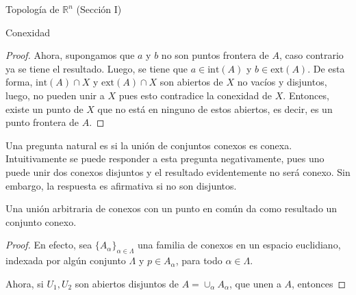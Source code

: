 \begin{chapter}{Topología de $\mathbb{R}^n$ (Sección I)}
\begin{section}{Conexidad}
\begin{proof}
Ahora, supongamos que $a$ y $b$ no son puntos frontera de $A$, caso contrario ya se tiene el resultado. Luego, se tiene que $a \in \text{int}(A)$ y $b \in \text{ext}(A)$. De esta forma, $\text{int}(A) \cap X$ y $\text{ext}(A) \cap X$ son abiertos de $X$ no vacíos y disjuntos, luego, no pueden unir a $X$ pues esto contradice la conexidad de $X$. Entonces, existe un punto de $X$ que no está en ninguno de estos abiertos, es decir, es un punto frontera de $A$.
\end{proof}

Una pregunta natural es si la unión de conjuntos conexos es conexa. Intuitivamente se puede responder a esta pregunta negativamente, pues uno puede unir dos conexos disjuntos y el resultado evidentemente no será conexo. Sin embargo, la respuesta es afirmativa si no son disjuntos.

\begin{them}

Una unión arbitraria de conexos con un punto en común da como resultado un conjunto conexo.

\end{them}

\begin{proof}

En efecto, sea $\{ A_{\alpha} \}_{\alpha \in \Lambda}$ una familia de conexos en un espacio euclidiano, indexada por algún conjunto $\Lambda$ y $p \in A_{\alpha}$, para todo $\alpha \in \Lambda$.

Ahora, si $U_1, U_2$ son abiertos disjuntos de $A = \cup_{\alpha} A_{\alpha}$, que unen a $A$, entonces

\end{proof}

\end{section}
\end{chapter}
